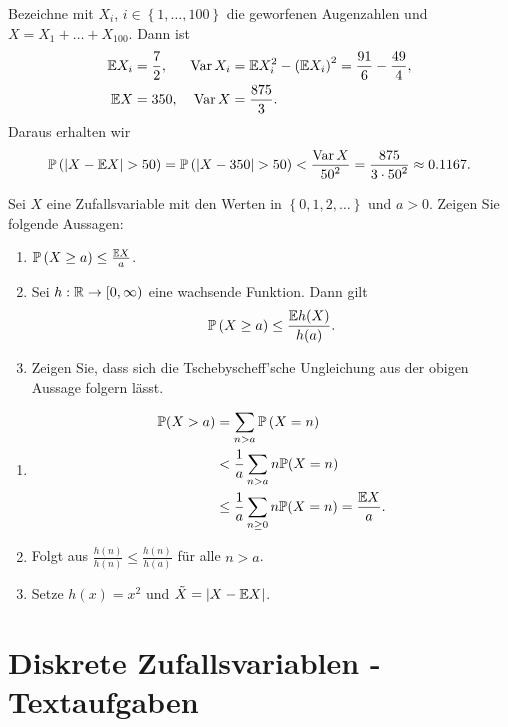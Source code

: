 \solution Bezeichne mit $X_i$, $i\in \left\{ 1,\dots ,100 \right\}$ die geworfenen
Augenzahlen und $X= X_1 +\dots + X_{100}$. Dann ist
\begin{align*}
    \mathbb E X_i &= \frac{7}{2}, & \operatorname{Var} X_i &= \mathbb E X_i^{2} - \left( \mathbb E X_i \right)^{2} = \frac{91}{6} - \frac{49}{4}, \\
    \mathbb E X &= 350, & \operatorname{Var} X &= \frac{875}{3}.
\end{align*}
Daraus erhalten wir
\begin{equation*}
    \mathbb P \left( | X - \mathbb E X | > 50 \right) = \mathbb P \left( | X - 350  | > 50 \right) < \frac{\operatorname{Var} X}{ {50}^2 } = \frac{875}{ 3 \cdot {50}^{2}} \approx 0.1167.
\end{equation*}

 Sei $X$ eine Zufallsvariable
mit den Werten in $\left\{ 0,1,2,\dots \right\}$ und $a> 0$. Zeigen Sie folgende Aussagen:
\begin{enumerate}
    \item $\mathbb P \left( X \geq a \right) \leq \frac{\mathbb E X}{a}$.

    \item Sei $h: \mathbb R \to [0,\infty)$ eine wachsende Funktion. Dann gilt
        \begin{equation*}
            \mathbb P \left( X \geq a \right) \leq \frac{\mathbb E h(X)}{ h(a)}. 
        \end{equation*}

    \item Zeigen Sie, dass sich die Tschebyscheff'sche Ungleichung aus der
        obigen Aussage folgern lässt. 
\end{enumerate}

\solution
\begin{enumerate}
    \item \begin{align*}
            \mathbb P( X > a ) &= \sum_{n > a} \mathbb P \left( X = n \right) \\
            &< \frac{1}{a} \sum_{n>a} n \mathbb P( X = n ) \\
            &\leq \frac{1}{a} \sum_{n \geq 0} n \mathbb P(X = n) = \frac{\mathbb E X}{ a}.
        \end{align*}
    \item Folgt aus $\frac{h(n)}{h(n)} \leq \frac{h(n)}{h(a)}$ für alle $n>a$.
    \item Setze $h(x) = x^{2}$ und $\tilde X = | X - \mathbb E X |$.
\end{enumerate}


\section{Diskrete Zufallsvariablen - Textaufgaben} 

